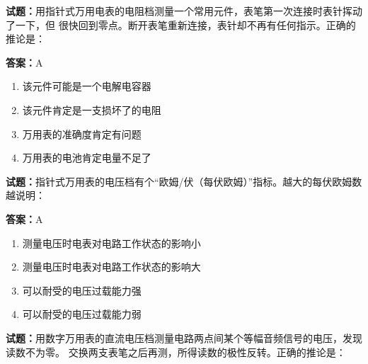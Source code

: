 \documentclass{ctexbook}
\begin{document}





\vspace{1em}

\textbf{试题：}用指针式万用电表的电阻档测量一个常用元件，表笔第一次连接时表针挥动了一下，但
很快回到零点。断开表笔重新连接，表针却不再有任何指示。正确的推论是： 

\textbf{答案：}A 

\begin{enumerate}[leftmargin=3em]
  \item 该元件可能是一个电解电容器 

  \item 该元件肯定是一支损坏了的电阻 

  \item 万用表的准确度肯定有问题 

  \item 万用表的电池肯定电量不足了 

\end{enumerate}





\vspace{1em}

\textbf{试题：}指针式万用表的电压档有个“欧姆/伏（每伏欧姆）”指标。越大的每伏欧姆数越说明： 

\textbf{答案：}A 

\begin{enumerate}[leftmargin=3em]
  \item 测量电压时电表对电路工作状态的影响小 

  \item 测量电压时电表对电路工作状态的影响大 

  \item 可以耐受的电压过载能力强 

  \item 可以耐受的电压过载能力弱 

\end{enumerate}





\vspace{1em}

\textbf{试题：}用数字万用表的直流电压档测量电路两点间某个等幅音频信号的电压，发现读数不为零。
交换两支表笔之后再测，所得读数的极性反转。正确的推论是： 
\end{document}
